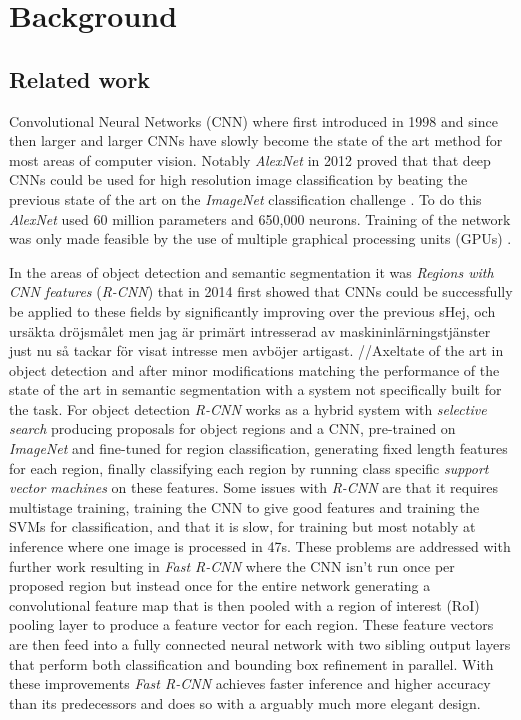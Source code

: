 \documentclass{kththesis}
\newcommand{\bibentry}[1]{\parencite{#1}}
\begin{document}
\chapter{Background}
\section{Related work}
Convolutional Neural Networks (CNN) where first introduced in 1998
\bibentry{lecun1998gradient} and since then larger and larger CNNs have slowly
become the state of the art method for most areas of computer vision. Notably
\emph{AlexNet} \bibentry{krizhevsky2012imagenet} in 2012 proved that that deep
CNNs could be used for high resolution image classification by beating the
previous state of the art \bibentry{sanchez2011high} on the \emph{ImageNet}
classification challenge \bibentry{deng2009imagenet}. To do this \emph{AlexNet}
used 60 million parameters and 650,000 neurons. Training of the network was
only made feasible by the use of multiple graphical processing units (GPUs)
\bibentry{krizhevsky2012imagenet}.

In the areas of object detection and semantic segmentation it was \emph{Regions
  with CNN features} (\emph{R-CNN}) \bibentry{girshick2014rich} that in 2014
first showed that CNNs could be successfully be applied to these fields by
significantly improving over the previous sHej, och ursäkta dröjsmålet men jag är primärt intresserad av maskininlärningstjänster just nu så tackar för visat intresse men avböjer artigast. //Axeltate of the art in object detection
\bibentry{ren2013histograms} and after minor modifications matching the
performance of the state of the art in semantic segmentation
\bibentry{carreira2012semantic} with a system not specifically built for the
task. For object detection \emph{R-CNN} works as a hybrid system with
\emph{selective search} \bibentry{uijlings2013selective} producing proposals for
object regions and a CNN, pre-trained on \emph{ImageNet}
\bibentry{deng2009imagenet} and fine-tuned for region classification, generating
fixed length features for each region, finally classifying each region by
running class specific \emph{support vector machines}
\bibentry{boser1992training} on these features. Some issues with \emph{R-CNN}
are that it requires multistage training, training the CNN to give good
features and training the SVMs for classification, and that it is slow, for
training but most notably at inference where one image is processed in 47s.
These problems are addressed with further work resulting in \emph{Fast R-CNN}
\bibentry{girshick2015fast} where the CNN isn't run once per proposed region but
instead once for the entire network generating a convolutional feature map that
is then pooled with a region of interest (RoI) pooling layer to produce a
feature vector for each region. These feature vectors are then feed into a fully
connected neural network with two sibling output layers that perform both
classification and bounding box refinement in parallel. With these improvements
\emph{Fast R-CNN} achieves faster inference and higher accuracy than its
predecessors and does so with a arguably much more elegant design.
\end{document}
